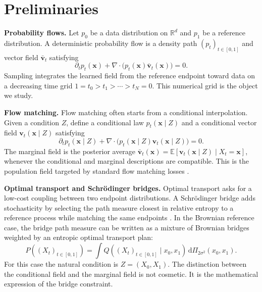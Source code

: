 \documentclass{article}
\newcommand{\R}{\mathbb{R}}
\newcommand{\E}{\mathbb{E}}
\newcommand{\dd}{\mathrm{d}}
\newcommand{\vx}{\bm{x}}
\newcommand{\vv}{\bm{v}}
\newcommand{\diver}{\nabla\!\cdot}
\theoremstyle{plain}
\theoremstyle{definition}
\theoremstyle{remark}
\begin{document}
\section{Preliminaries}
\label{sec:setup}

\textbf{Probability flows.} Let $p_0$ be a data distribution on $\R^d$ and $p_1$ be a reference distribution. A deterministic probability flow is a density path $(p_t)_{t\in[0,1]}$ and vector field $\bar{\vv}_t$ satisfying
\begin{equation}
  \partial_t p_t(\vx) + \diver\big(p_t(\vx)\bar{\vv}_t(\vx)\big)=0.
  \label{eq:continuity}
\end{equation}
Sampling integrates the learned field from the reference endpoint toward data on a decreasing time grid $1=t_0>t_1>\cdots>t_N=0$. This numerical grid is the object we study.

\textbf{Flow matching.} Flow matching often starts from a conditional interpolation. Given a condition $Z$, define a conditional law $p_t(\vx\mid Z)$ and a conditional vector field $\vv_t(\vx\mid Z)$ satisfying
\begin{equation}
  \partial_t p_t(\vx\mid Z) + \diver\big(p_t(\vx\mid Z)\vv_t(\vx\mid Z)\big)=0.
  \label{eq:conditional_continuity}
\end{equation}
The marginal field is the posterior average
  $\bar{\vv}_t(\vx)
  =
  \E\!\left[\vv_t(\vx\mid Z)\mid X_t=\vx\right]$,
whenever the conditional and marginal descriptions are compatible. This is the population field targeted by standard flow matching losses \citep{lipman2023flow,liu2023rectified,albergo2023building}.

\textbf{Optimal transport and Schr\"odinger bridges.} Optimal transport asks for a low-cost coupling between two endpoint distributions. A Schr\"odinger bridge adds stochasticity by selecting the path measure closest in relative entropy to a reference process while matching the same endpoints \citep{schrodinger1931,schrodinger1932,leonard2014schrodinger}. In the Brownian reference case, the bridge path measure can be written as a mixture of Brownian bridges weighted by an entropic optimal transport plan:
\begin{equation}
  P((X_t)_{t\in[0,1]})
  =
  \int Q((X_t)_{t\in[0,1]}\mid x_0,x_1)
  \,\dd \Pi_{2\sigma^2}(x_0,x_1).
  \label{eq:sb_mixture}
\end{equation}
For this case the natural condition is $Z=(X_0,X_1)$. The distinction between the conditional field and the marginal field is not cosmetic. It is the mathematical expression of the bridge constraint.
\end{document}
